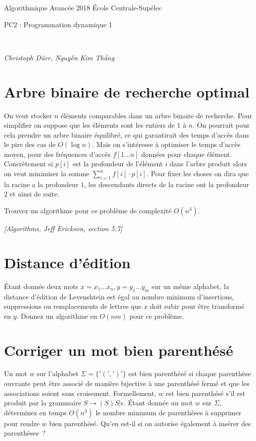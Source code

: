 \documentclass[12pt]{article}
\newcommand{\source}[1]{\begin{flushright}\emph{[#1]}\end{flushright}}
\newcommand{\MakeScribeTop}[1]{
\noindent
\begin{framed}
\noindent
 Algorithmique Avancée 2018
 \hfill
 École Centrale-Supélec
 \\[1em]
 \centerline{ \Large
#1
 }
 \\[1em]
\centerline{  \it Christoph Dürr, Nguyễn Kim Thắng}
\end{framed}
}
\begin{document}
    \MakeScribeTop{PC2 : Programmation dynamique 1}

    \section{Arbre binaire de recherche optimal}

    On veut stocker $n$ éléments comparables dans un arbre binaire de recherche.
    Pour simplifier on suppose que les éléments sont les entiers de $1$ à $n$.
    On pourrait pour cela prendre un arbre binaire équilibré, ce qui garantirait des temps d'accès dans le pire des cas de $O(\log n)$.  Mais on s'intéresse à optimiser le temps d'accès moyen, pour des fréquences d'accès $f[1\ldots n]$ données pour chaque élément.
    Concrètement si $p[i]$ est la profondeur de l'élément $i$ dans l'arbre produit alors on veut minimiser la somme $\sum_{i=1}^n f[i]\cdot p[i]$.
    Pour fixer les choses on dira que la racine a la profondeur $1$, les descendants directs de la racine ont la profondeur $2$ et ainsi de suite.

    Trouvez un algorithme pour ce problème de complexité $O(n^3)$.

\source{Algorithms, Jeff Erickson, section 5.7}

\section{Distance d'édition}

Étant donnée deux mots $x=x_1 \ldots x_n,y=y_1\ldots y_m$ sur un même alphabet, la distance d'édition de Levenshtein est égal au nombre minimum d'insertions, suppressions ou remplacements de lettres que $x$ doit subir pour être transformé en $y$.  Donnez un algorithme en $O(n m)$ pour ce problème.

\section{Corriger un mot bien parenthésé}

Un mot $w$ sur l'alphabet $\Sigma=\{'(',')'\}$  est bien parenthésé si chaque parenthèse ouvrante peut être associé de manière bijective à une parenthésé fermé et que les associations soient sans croisement.  Formellement, $w$ est bien parenthésé s'il est produit par la grammaire $S\rightarrow (S)S | \epsilon $.  Étant donnée un mot $w$ sur $\Sigma$, déterminez en temps $O(n^3)$ le nombre minimum de parenthèses à supprimer pour rendre $w$ bien parenthésé. Qu'en est-il si on autorise également à insérer des parenthèses~?
\end{document}
